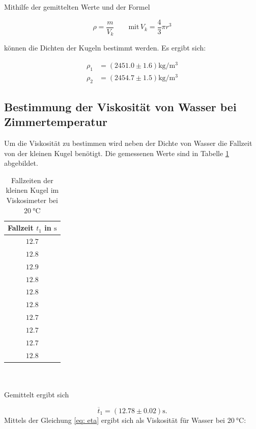 Mithilfe der gemittelten Werte und der Formel

\begin{equation*}
\rho=\frac{m}{V_{k}} \qquad \text{mit} \, V_{k}=\frac{4}{3}\pi r^3
\end{equation*}

können die Dichten der Kugeln bestimmt werden.
Es ergibt sich:

\begin{align*}
\rho_{1}&=\left(\num{2451.0}\pm\num{1.6}\right) \si{\kilogram\per\cubic\meter}\\
\rho_{2}&=\left(\num{2454.7}\pm\num{1.5}\right) \si{\kilogram\per\cubic\meter}
\end{align*}

\subsection{Bestimmung der Viskosität von Wasser bei Zimmertemperatur} \label{sec:visko}
Um die Viskosität zu bestimmen wird neben der Dichte von Wasser die Fallzeit von der kleinen Kugel benötigt.
Die gemessenen Werte sind in Tabelle \ref{tab:messwerte_fallzeit_kugel_klein} abgebildet. 
\begin{table}
\centering
\begin{tabular} {c}
	\toprule
  Fallzeit $t_1$ in $\si{\second}$ \\
  \midrule
  $\num{12.7}$ \\
  $\num{12.8}$ \\
  $\num{12.9}$ \\
  $\num{12.8}$ \\
  $\num{12.8}$ \\
  $\num{12.8}$ \\
  $\num{12.7}$ \\
  $\num{12.7}$ \\
  $\num{12.7}$ \\
  $\num{12.8}$ \\
\bottomrule
\end{tabular}
\caption{Fallzeiten der kleinen Kugel im Viskosimeter bei $\SI{20}{\degreeCelsius}$}
\label{tab:messwerte_fallzeit_kugel_klein}
\end{table}
\\
\\
\hfill
Gemittelt ergibt sich

\begin{equation}
\label{eq:gemittelte_fallzeit_klein}
\overline{t}_{1}=\left(\num{12.78}\pm\num{0.02}\right) \si{\second}.
\end{equation}
Mittels der Gleichung \eqref{eq: eta} ergibt sich als Viskosität
für Wasser bei $\SI{20}{\degreeCelsius}$:

